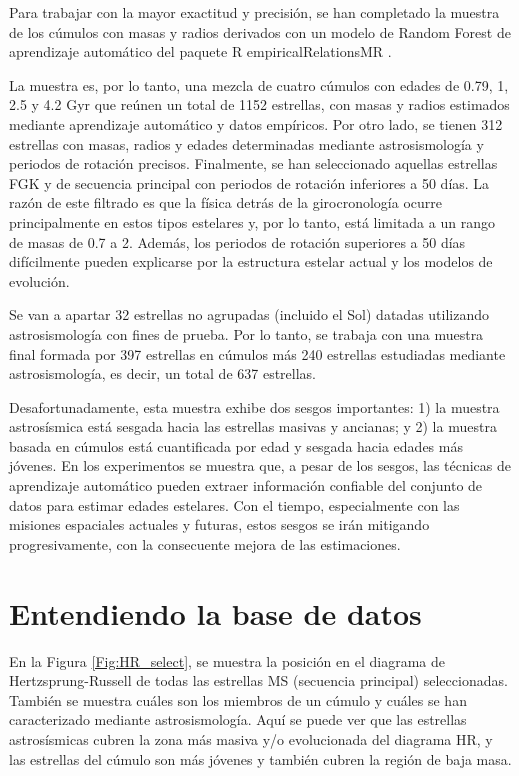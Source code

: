 Para trabajar con la mayor exactitud y precisión, se han completado la muestra de los cúmulos con masas y radios derivados con un modelo de Random Forest de aprendizaje automático del paquete R empiricalRelationsMR \cite{Moya18}.


La muestra es, por lo tanto, una mezcla de cuatro cúmulos con edades de 0.79, 1, 2.5 y 4.2 Gyr que reúnen un total de 1152 estrellas, con masas y radios estimados mediante aprendizaje automático y datos empíricos. Por otro lado, se tienen 312 estrellas con masas, radios y edades determinadas mediante astrosismología y periodos de rotación precisos. Finalmente, se han seleccionado aquellas estrellas FGK y de secuencia principal con periodos de rotación inferiores a 50 días. La razón de este filtrado es que la física detrás de la girocronología ocurre principalmente en estos tipos estelares y, por lo tanto, está limitada a un rango de masas de 0.7 a 2. Además, los periodos de rotación superiores a 50 días difícilmente pueden explicarse por la estructura estelar actual y los modelos de evolución.

Se van a apartar 32 estrellas no agrupadas (incluido el Sol) datadas utilizando astrosismología con fines de prueba. Por lo tanto, se trabaja con una muestra final formada por 397 estrellas en cúmulos más 240 estrellas estudiadas mediante astrosismología, es decir, un total de 637 estrellas.

Desafortunadamente, esta muestra exhibe dos sesgos importantes: 1) la muestra astrosísmica está sesgada hacia las estrellas masivas y ancianas; y 2) la muestra basada en cúmulos está cuantificada por edad y sesgada hacia edades más jóvenes. En los experimentos se muestra que, a pesar de los sesgos, las técnicas de aprendizaje automático pueden extraer información confiable del conjunto de datos para estimar edades estelares. Con el tiempo, especialmente con las misiones espaciales actuales y futuras, estos sesgos se irán mitigando progresivamente, con la consecuente mejora de las estimaciones.


\section{Entendiendo la base de datos}

En la Figura \ref{Fig:HR_select}, se muestra la posición en el diagrama de Hertzsprung-Russell de todas las estrellas MS (secuencia principal) seleccionadas. También se muestra cuáles son los miembros de un cúmulo y cuáles se han caracterizado mediante astrosismología. Aquí se puede ver que las estrellas astrosísmicas cubren la zona más masiva y/o evolucionada del diagrama HR, y las estrellas del cúmulo son más jóvenes y también cubren la región de baja masa.

